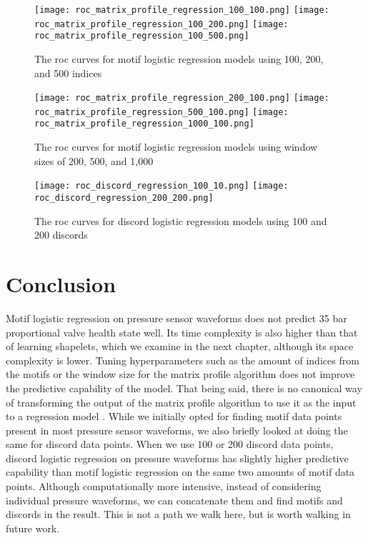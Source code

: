 \begin{figure}
  \begin{center}
    \texttt{[image: roc\_matrix\_profile\_regression\_100\_100.png]}
    \texttt{[image: roc\_matrix\_profile\_regression\_100\_200.png]}
    \texttt{[image: roc\_matrix\_profile\_regression\_100\_500.png]}
  \end{center}
  \caption{The \acrshort{roc} curves for motif logistic regression models using 100, 200, and 500 indices}
  \label{fig:roc-matrix-profile}
\end{figure}

\begin{figure}
  \begin{center}
  \texttt{[image: roc\_matrix\_profile\_regression\_200\_100.png]}
  \texttt{[image: roc\_matrix\_profile\_regression\_500\_100.png]}
  \texttt{[image: roc\_matrix\_profile\_regression\_1000\_100.png]}
  \end{center}
  \caption{The \acrshort{roc} curves for motif logistic regression models using window sizes of 200, 500, and 1,000}
  \label{fig:roc-matrix-profile-window}
\end{figure}

\begin{figure}
  \begin{center}
  \texttt{[image: roc\_discord\_regression\_100\_10.png]}
  \texttt{[image: roc\_discord\_regression\_200\_200.png]}
  \end{center}
  \caption{The \acrshort{roc} curves for discord logistic regression models using 100 and 200 discords}
  \label{fig:roc-matrix-profile-discord}
\end{figure}

\section{Conclusion}

Motif logistic regression on pressure sensor waveforms does not predict 35 bar proportional valve health state well.
Its time complexity is also higher than that of learning shapelets, which we examine in the next chapter, although its space complexity is lower.
Tuning hyperparameters such as the amount of indices from the motifs or the window size for the matrix profile algorithm does not improve the predictive capability of the model.
That being said, there is no canonical way of transforming the output of the matrix profile algorithm to use it as the input to a regression model \citep{DBLP:journals/frai/GuidottiD21,seoni2021template}.
While we initially opted for finding motif data points present in most pressure sensor waveforms, we also briefly looked at doing the same for discord data points.
When we use 100 or 200 discord data points, discord logistic regression on pressure waveforms has slightly higher predictive capability than motif logistic regression on the same two amounts of motif data points.
Although computationally more intensive, instead of considering individual pressure waveforms, we can concatenate them and find motifs and discords in the result.
This is not a path we walk here, but is worth walking in future work.
